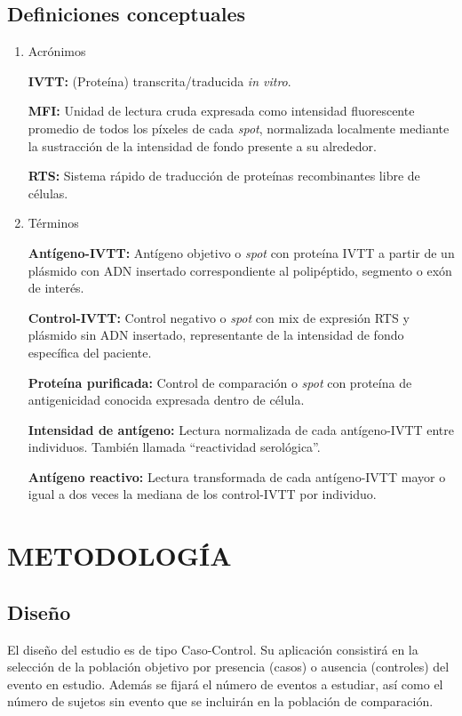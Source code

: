 \documentclass[a4paper]{article}
\begin{document}
\subsection{Definiciones conceptuales}\label{definiciones-conceptuales}

\begin{enumerate}
\def\labelenumi{\alph{enumi}.}
\item
  Acrónimos

  \textbf{IVTT:} (Proteína) transcrita/traducida \emph{in vitro}.

  \textbf{MFI:} Unidad de lectura cruda expresada como intensidad
  fluorescente promedio de todos los píxeles de cada \emph{spot},
  normalizada localmente mediante la sustracción de la intensidad de
  fondo presente a su alrededor.

  \textbf{RTS:} Sistema rápido de traducción de proteínas recombinantes
  libre de células.
\item
  Términos

  \textbf{Antígeno-IVTT:} Antígeno objetivo o \emph{spot} con proteína
  IVTT a partir de un plásmido con ADN insertado correspondiente al
  polipéptido, segmento o exón de interés.

  \textbf{Control-IVTT:} Control negativo o \emph{spot} con mix de
  expresión RTS y plásmido sin ADN insertado, representante de la
  intensidad de fondo específica del paciente.

  \textbf{Proteína purificada:} Control de comparación o \emph{spot} con
  proteína de antigenicidad conocida expresada dentro de célula.

  \textbf{Intensidad de antígeno:} Lectura normalizada de cada
  antígeno-IVTT entre individuos. También llamada ``reactividad
  serológica''.

  \textbf{Antígeno reactivo:} Lectura transformada de cada antígeno-IVTT
  mayor o igual a dos veces la mediana de los control-IVTT por
  individuo.
\end{enumerate}

\section{METODOLOGÍA}\label{meto}

\subsection{Diseño}\label{diseno}

El diseño del estudio es de tipo Caso-Control. Su aplicación consistirá
en la selección de la población objetivo por presencia (casos) o
ausencia (controles) del evento en estudio. Además se fijará el número
de eventos a estudiar, así como el número de sujetos sin evento que se
incluirán en la población de comparación.
\end{document}
